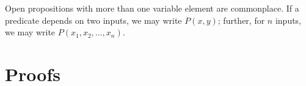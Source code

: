         Open propositions with more than one variable element are commonplace. If a predicate depends on two inputs, we may write $P(x,y)$; further, for $n$ inputs, we may write $P(x_1, x_2, \ldots, x_n)$.




    \section{Proofs}\label{sec:proof}



    